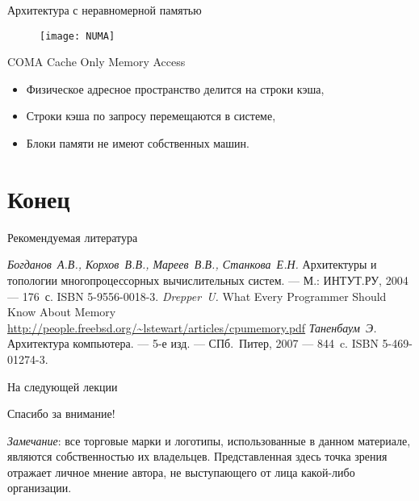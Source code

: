 \begin{frame}{Архитектура с неравномерной памятью}
\begin{figure}[htpb]
    \centering
    \texttt{[image: NUMA]}
\end{figure}
\end{frame}

\begin{frame}{COMA}
\vfill
Cache Only Memory Access
\vfill
\begin{itemize}
    \item Физическое адресное пространство делится на строки кэша,
    \item Строки кэша по запросу перемещаются в системе,
    \item Блоки памяти не имеют собственных машин.
\end{itemize}
\end{frame}

\section*{Конец}

\begin{frame}[allowframebreaks]{Рекомендуемая литература}
\begin{thebibliography}{99}
    \bibitem{} \textit{Богданов~А.В., Корхов~В.В., Мареев~В.В., Станкова~Е.Н.}
    Архитектуры и топологии многопроцессорных вычислительных систем. --- М.:
    ИНТУТ.РУ, 2004 --- 176~с. ISBN 5-9556-0018-3.
    \bibitem{} \textit{Drepper~U.} What Every Programmer Should Know About Memory
    \url{http://people.freebsd.org/~lstewart/articles/cpumemory.pdf}
    \bibitem{} \textit{Таненбаум~Э.} Архитектура компьютера. --- 5-е изд. ---
        СПб.~Питер, 2007 --- 844~c. ISBN 5-469-01274-3.
\end{thebibliography}
\end{frame}

\begin{frame}{На следующей лекции}
\end{frame}

\begin{frame}

{\huge{Спасибо за внимание!}\par}

\vfill

\tiny{\textit{Замечание}: все торговые марки и логотипы, использованные в данном материале, являются собственностью их владельцев. Представленная здесь точка зрения отражает личное мнение автора, не выступающего от лица какой-либо организации.}

\end{frame}


